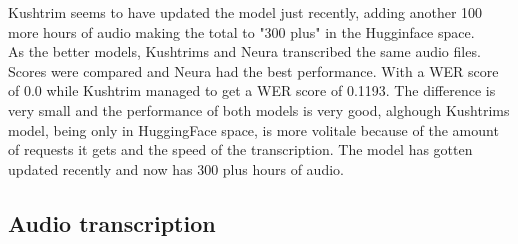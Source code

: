 \documentclass[12pt]{article}
\begin{document}
Kushtrim seems to have updated the model just recently, adding another 100 more hours of audio making the total to "300 plus" in the Hugginface space.\\

As the better models, Kushtrims and Neura transcribed the same audio files. Scores were compared and Neura had the best performance. With a WER score of 0.0 while Kushtrim managed to get a WER score of 0.1193. The difference is very small and the performance of both models is very good, alghough Kushtrims model, being only in HuggingFace space, is more volitale because of the amount of requests it gets and the speed of the transcription. The model has gotten updated recently and now has 300 plus hours of audio.

\subsection{Audio transcription}
\end{document}
